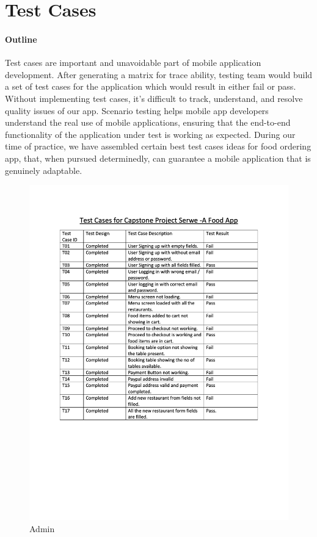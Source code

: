 \documentclass[12pt]{article}
\begin{document}
\section{Test Cases}

\paragraph{Outline}
Test cases are important and unavoidable part of mobile application development. After generating a matrix for trace ability, testing team would build a set of test cases for the application which would result in either fail or pass. Without implementing test cases, it’s difficult to track, understand, and resolve quality issues of our app.
Scenario testing helps mobile app developers understand the real use of mobile applications, ensuring that the end-to-end functionality of the application under test is working as expected. 
During our time of practice, we have assembled certain best test cases ideas for food ordering app, that, when pursued determinedly, can guarantee a mobile application that is genuinely adaptable.

\begin{figure}
\centering
\includegraphics[scale=0.4]{test.jpg}
\caption{Admin}

\end{figure}
































\end{document}
